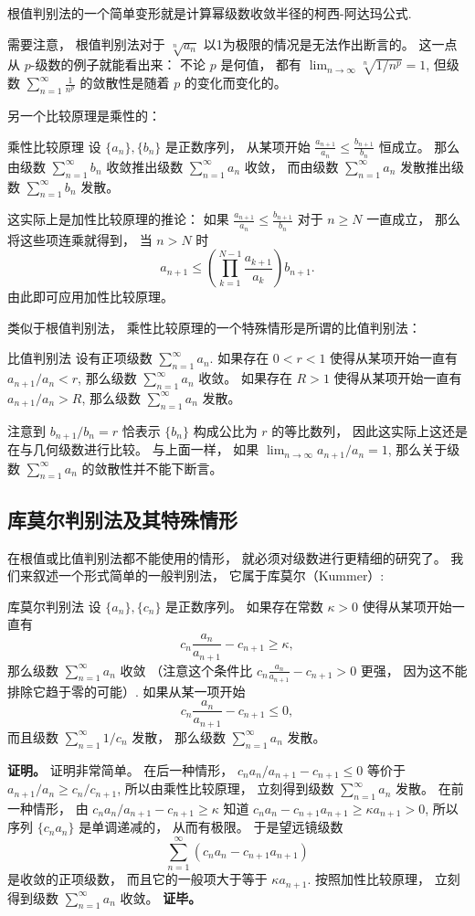 根值判别法的一个简单变形就是计算幂级数收敛半径的柯西-阿达玛公式.

需要注意， 根值判别法对于 $\sqrt[n]{a_n}$ 以1为极限的情况是无法作出断言的。 这一点从 $p$-级数的例子就能看出来： 不论 $p$ 是何值， 都有 $\lim_{n\to\infty}\sqrt[n]{1/n^p}=1$, 但级数 $\sum_{n=1}^\infty\frac{1}{n^p}$ 的敛散性是随着 $p$ 的变化而变化的。

另一个比较原理是乘性的：
\begin{theorem}{乘性比较原理}
设 $\{a_n\},\{b_n\}$ 是正数序列， 从某项开始 $\frac{a_{n+1}}{a_n}\leq \frac{b_{n+1}}{b_n}$ 恒成立。 那么由级数 $\sum_{n=1}^\infty b_n$ 收敛推出级数 $\sum_{n=1}^\infty a_n$ 收敛， 而由级数 $\sum_{n=1}^\infty a_n$ 发散推出级数 $\sum_{n=1}^\infty b_n$ 发散。
\end{theorem}
这实际上是加性比较原理的推论： 如果 $\frac{a_{n+1}}{a_n}\leq \frac{b_{n+1}}{b_n}$ 对于 $n\geq N$ 一直成立， 那么将这些项连乘就得到， 当 $n>N$ 时
$$
a_{n+1}\leq \left(\prod_{k=1}^{N-1}\frac{a_{k+1}}{a_k}\right)b_{n+1}.
$$
由此即可应用加性比较原理。

类似于根值判别法， 乘性比较原理的一个特殊情形是所谓的比值判别法：
\begin{theorem}{比值判别法}
设有正项级数 $\sum_{n=1}^\infty a_n$. 如果存在 $0<r<1$ 使得从某项开始一直有 $a_{n+1}/a_n<r$, 那么级数 $\sum_{n=1}^\infty a_n$ 收敛。 如果存在 $R>1$ 使得从某项开始一直有 $a_{n+1}/{a_n}>R$, 那么级数 $\sum_{n=1}^\infty a_n$ 发散。
\end{theorem}
注意到 $b_{n+1}/b_n=r$ 恰表示 $\{b_n\}$ 构成公比为 $r$ 的等比数列， 因此这实际上这还是在与几何级数进行比较。 与上面一样， 如果 $\lim_{n\to\infty}a_{n+1}/a_n=1$, 那么关于级数 $\sum_{n=1}^\infty a_n$ 的敛散性并不能下断言。

\subsection{库莫尔判别法及其特殊情形}
在根值或比值判别法都不能使用的情形， 就必须对级数进行更精细的研究了。 我们来叙述一个形式简单的一般判别法， 它属于库莫尔（Kummer）:

\begin{theorem}{库莫尔判别法}
设 $\{a_n\},\{c_n\}$ 是正数序列。 如果存在常数 $\kappa>0$ 使得从某项开始一直有
$$
c_n\frac{a_n}{a_{n+1}}-c_{n+1}\geq \kappa,
$$
那么级数 $\sum_{n=1}^\infty a_n$ 收敛 （注意这个条件比 $c_n\frac{a_n}{a_{n+1}}-c_{n+1}>0$ 更强， 因为这不能排除它趋于零的可能）. 如果从某一项开始
$$
c_n\frac{a_n}{a_{n+1}}-c_{n+1} \leq0,
$$
而且级数 $\sum_{n=1}^\infty 1/c_n$ 发散， 那么级数 $\sum_{n=1}^\infty a_n$ 发散。
\end{theorem}
\textbf{证明。} 证明非常简单。 在后一种情形， $c_n{a_n}/{a_{n+1}}-c_{n+1} \leq0$ 等价于 $a_{n+1}/a_n\geq c_{n}/c_{n+1}$, 所以由乘性比较原理， 立刻得到级数 $\sum_{n=1}^\infty a_n$ 发散。 在前一种情形， 由 $c_n{a_n}/{a_{n+1}}-c_{n+1}\geq \kappa$ 知道 $c_na_n-c_{n+1}a_{n+1}\geq \kappa a_{n+1}>0$, 所以序列 $\{c_na_n\}$ 是单调递减的， 从而有极限。 于是望远镜级数
$$
\sum_{n=1}^\infty (c_na_n-c_{n+1}a_{n+1})
$$
是收敛的正项级数， 而且它的一般项大于等于 $\kappa a_{n+1}$. 按照加性比较原理， 立刻得到级数 $\sum_{n=1}^\infty a_n$ 收敛。 \textbf{证毕。}

